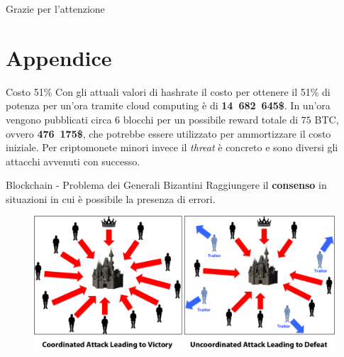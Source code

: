 \documentclass{beamer}
\begin{document}
\begin{frame}[focus]
	Grazie per l'attenzione
\end{frame}


\appendix


\section{Appendice}

\begin{frame}{Costo 51\%}
	Con gli attuali valori di hashrate il costo per ottenere il 51\% di potenza per un'ora tramite cloud computing è di \textbf{14~682~645\$}.\vfill    
    In un'ora vengono pubblicati circa $6$ blocchi per un possibile reward totale di $75$ BTC, ovvero \textbf{476~175\$}, che potrebbe essere utilizzato per ammortizzare il costo iniziale.
	\vfill
	Per criptomonete minori invece il \textit{threat} è concreto e sono diversi gli attacchi avvenuti con successo.
\end{frame}

\begin{frame}{Blockchain - Problema dei Generali Bizantini}
	Raggiungere il \textbf{consenso} in situazioni in cui è possibile la presenza di errori.
	\begin{figure}
    	\centering
        \includegraphics[width=\textwidth]{./images/byzantine.png}
    \end{figure}
\end{frame}
\end{document}

